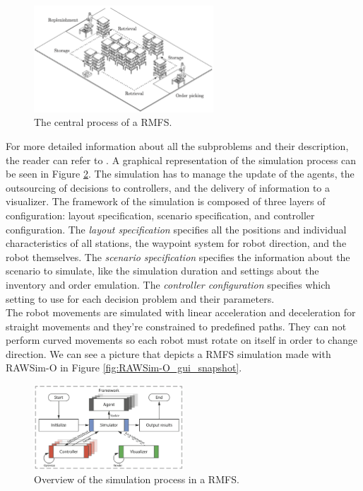 \documentclass[../../Thesis.tex]{subfiles}
\begin{document}
			\begin{figure}
			    \centering
			    \includegraphics[width=0.6\textwidth]{../../Images/Data_collection/RMFS_storage_and_retrieval_process.png}
			    \caption{The central process of a RMFS.}
			    \label{fig:RMFS_central_process}
			\end{figure}
			For more detailed information about all the subproblems and their description, the reader can refer to \cite{Merschformann2018}.
			A graphical representation of the simulation process can be seen in Figure \ref{fig:RMFS_graphical_simulation_process}. The simulation has to manage the update of the agents, the outsourcing of decisions to controllers, and the delivery of information to a visualizer. The framework of the simulation is composed of three layers of configuration: layout specification, scenario specification, and controller configuration. The \textit{layout specification} specifies all the positions and individual characteristics of all stations, the waypoint system for robot direction, and the robot themselves. The \textit{scenario specification} specifies the information about the scenario to simulate, like the simulation duration and settings about the inventory and order emulation. The \textit{controller configuration} specifies which setting to use for each decision problem and their parameters.\\
			The robot movements are simulated with linear acceleration and deceleration for straight movements and they're constrained to predefined paths. They can not perform curved movements so each robot must rotate on itself in order to change direction. We can see a picture that depicts a RMFS simulation made with RAWSim-O in Figure \ref{fig:RAWSim-O_gui_snapshot}.
			
			\begin{figure}
			    \centering
			    \includegraphics[width=0.5\textwidth]{../../Images/Data_collection/RMFS_simulation_process_graphical.png}
			    \caption{Overview of the simulation process in a RMFS.}
			    \label{fig:RMFS_graphical_simulation_process}
			\end{figure}
			
\end{document}
